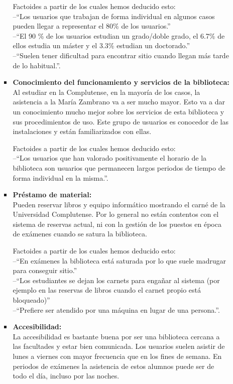 \documentclass[12pt]{article}
\begin{document}
\begin{itemize}
\begin{itemize}
\begin{itemize}
			Factoides a partir de los cuales hemos deducido esto: \\--``Los usuarios que trabajan de forma individual en algunos casos pueden llegar a representar el 80\% de los usuarios.''\\ --``El 90 \% de los usuarios estudian un grado/doble grado, el 6.7\% de ellos estudia un máster y el 3.3\% estudian un doctorado.''\\ --``Suelen tener dificultad para encontrar sitio cuando llegan más tarde de lo habitual.''.

		\item \textbf{Conocimiento del funcionamiento y servicios de la biblioteca: \\}
			Al estudiar en la Complutense, en la mayoría de los casos, la asistencia a la María Zambrano va a ser mucho mayor. Esto va a dar un conocimiento mucho mejor sobre los servicios de esta biblioteca y sus procedimientos de uso. Este grupo de usuarios es conocedor de las instalaciones y están familiarizados con ellas.

			Factoides a partir de los cuales hemos deducido esto: \\--``Los usuarios que han valorado positivamente el horario de la biblioteca son usuarios que permanecen largos periodos de tiempo de forma individual en la misma.''.

		\item \textbf{Préstamo de material: \\}
			Pueden reservar libros y equipo informático mostrando el carné de la Universidad Complutense. Por lo general no están contentos con el sistema de reservas actual, ni con la gestión de los puestos en época de exámenes cuando se satura la biblioteca.

			Factoides a partir de los cuales hemos deducido esto: \\--``En exámenes la biblioteca está saturada por lo que suele madrugar para conseguir sitio.'' \\--``Los estudiantes se dejan los carnets para engañar al sistema (por ejemplo en las reservas de libros cuando el carnet propio está bloqueado)'' \\--``Prefiere ser atendido por una máquina en lugar de una persona.''.

		\item \textbf{Accesibilidad: \\}
			La accesibilidad es bastante buena por ser una biblioteca cercana a las facultades y estar bien comunicada. Los usuarios suelen asistir de lunes a viernes con mayor frecuencia que en los fines de semana. En periodos de exámenes la asistencia de estos alumnos puede ser de todo el día, incluso por las noches.


\end{itemize}
\end{itemize}
\end{itemize}
\end{document}
